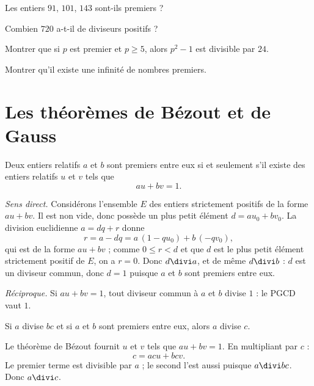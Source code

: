 \begin{entrainement}
\exo[\niveau{1}] Les entiers $91$, $101$, $143$ sont-ils premiers ?

\exo[\niveau{1}] Combien $720$ a-t-il de diviseurs positifs ?

\exo[\niveau{2}] Montrer que si $p$ est premier et $p \geq 5$, alors $p^{2}-1$
est divisible par $24$.

\exo[\niveau{3}] Montrer qu'il existe une infinité de nombres premiers.
\end{entrainement}

\section{Les théorèmes de Bézout et de Gauss}

\begin{theoreme}
Deux entiers relatifs $a$ et $b$ sont premiers entre eux si et seulement s'il
existe des entiers relatifs $u$ et $v$ tels que
\[
  au+bv = 1 .
\]
\end{theoreme}

\begin{demonstration}
\emph{Sens direct.} Considérons l'ensemble $E$ des entiers strictement
positifs de la forme $au+bv$. Il est non vide, donc possède un plus petit
élément $d = au_{0}+bv_{0}$. La division euclidienne $a = dq+r$ donne
\[
  r = a-dq = a\,(1-qu_{0})+b\,(-qv_{0}),
\]
qui est de la forme $au+bv$ ; comme $0 \leq r < d$ et que $d$ est le plus
petit élément strictement positif de $E$, on a $r = 0$. Donc $d \divi a$, et
de même $d \divi b$ : $d$ est un diviseur commun, donc $d = 1$ puisque $a$ et
$b$ sont premiers entre eux.

\smallskip
\emph{Réciproque.} Si $au+bv = 1$, tout diviseur commun à $a$ et $b$ divise
$1$ : le PGCD vaut $1$.
\end{demonstration}

\begin{theoreme}
Si $a$ divise $bc$ et si $a$ et $b$ sont premiers entre eux, alors $a$ divise
$c$.
\end{theoreme}

\begin{demonstration}
Le théorème de Bézout fournit $u$ et $v$ tels que $au+bv = 1$. En multipliant
par $c$ :
\[
  c = acu+bcv .
\]
Le premier terme est divisible par $a$ ; le second l'est aussi puisque
$a \divi bc$. Donc $a \divi c$.
\end{demonstration}

